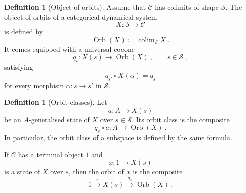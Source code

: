 \documentclass[a4paper,reqno,oneside]{amsart}
\theoremstyle{definition}
\newtheorem{definition}[theorem]{Definition}
\theoremstyle{remark}
\numberwithin{equation}{section}
\begin{document}
	
	
	\begin{definition}[Object of orbits]
		Assume that $\mathcal C$ has colimits of shape $\mathcal S$. The object of
		orbits of a categorical dynamical system
		\begin{equation}
			X\colon \mathcal S\to\mathcal C
		\end{equation}
		is defined by
		\begin{equation}
			\operatorname{Orb}(X)\coloneqq \operatorname{colim}_{\mathcal S}X \ .
		\end{equation}
		It comes equipped with a universal cocone
		\begin{equation}
			q_s\colon X(s)\longrightarrow \operatorname{Orb}(X) \ ,
			\qquad s\in\mathcal S \ ,
		\end{equation}
		satisfying
		\begin{equation}
			q_{s'}\circ X(\alpha)=q_s
		\end{equation}
		for every morphism $\alpha\colon s\to s'$ in $\mathcal S$.
	\end{definition}
	
	
	
	\begin{definition}[Orbit classes]
		Let
		\begin{equation}
			a\colon A\longrightarrow X(s)
		\end{equation}
		be an $A$-generalised state of $X$ over $s\in\mathcal S$. Its orbit class is
		the composite
		\begin{equation}
			q_s\circ a\colon A\longrightarrow \operatorname{Orb}(X) \ .
		\end{equation}
		In particular, the orbit class of a subspace is defined by the same formula.
		
		If $\mathcal C$ has a terminal object $1$ and
		\begin{equation}
			x\colon 1\longrightarrow X(s)
		\end{equation}
		is a state of $X$ over $s$, then the orbit of $x$ is the composite
		\begin{equation}
			1\xrightarrow{x}X(s)
			\xrightarrow{q_s}
			\operatorname{Orb}(X) \ .
		\end{equation}
	\end{definition}
	
\end{document}

